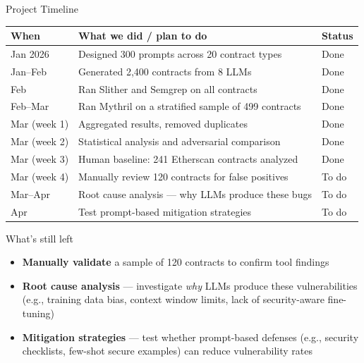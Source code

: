 \documentclass[aspectratio=169]{beamer}
\begin{document}
\begin{frame}{Project Timeline}
\begin{center}
\small
\begin{tabular}{@{}lll@{}}
\toprule
\textbf{When} & \textbf{What we did / plan to do} & \textbf{Status} \\
\midrule
Jan 2026     & Designed 300 prompts across 20 contract types          & Done \\
Jan--Feb     & Generated 2,400 contracts from 8 LLMs                  & Done \\
Feb          & Ran Slither and Semgrep on all contracts                & Done \\
Feb--Mar     & Ran Mythril on a stratified sample of 499 contracts    & Done \\
Mar (week 1) & Aggregated results, removed duplicates                  & Done \\
Mar (week 2) & Statistical analysis and adversarial comparison         & Done \\
Mar (week 3) & Human baseline: 241 Etherscan contracts analyzed        & Done \\
\midrule
Mar (week 4) & Manually review 120 contracts for false positives       & To do \\
Mar--Apr     & Root cause analysis --- why LLMs produce these bugs    & To do \\
Apr          & Test prompt-based mitigation strategies                 & To do \\
\bottomrule
\end{tabular}
\end{center}

\vspace{0.3cm}
\begin{block}{What's still left}
\begin{itemize}\small
    \item \textbf{Manually validate} a sample of 120 contracts to confirm tool findings
    \item \textbf{Root cause analysis} --- investigate \emph{why} LLMs produce these vulnerabilities (e.g., training data bias, context window limits, lack of security-aware fine-tuning)
    \item \textbf{Mitigation strategies} --- test whether prompt-based defenses (e.g., security checklists, few-shot secure examples) can reduce vulnerability rates
\end{itemize}
\end{block}
\end{frame}
\end{document}
